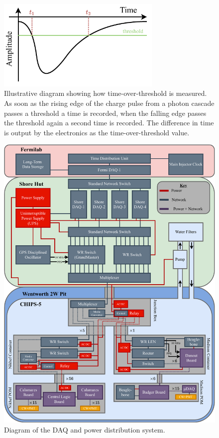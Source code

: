 \begin{figure} %
    \includegraphics[width=0.7\textwidth]{diagrams/5-daq/tot.pdf}
    \caption[Illustrative diagram showing how time-over-threshold is measured.]
    {Illustrative diagram showing how time-over-threshold is measured. As soon as the rising edge
        of the charge pulse from a photon cascade passes a threshold a time is recorded, when the
        falling edge passes the threshold again a second time is recorded. The difference in time
        is output by the electronics as the time-over-threshold value.}
    \label{fig:tot}
\end{figure}

\begin{figure} %
    \includegraphics[width=\textwidth]{diagrams/5-daq/daq.pdf}
    \caption[Diagram of the \chipsfive data acquisition and power distribution system.]
    {Diagram of the \chipsfive DAQ and power distribution system.}
    \label{fig:daq}
\end{figure}

